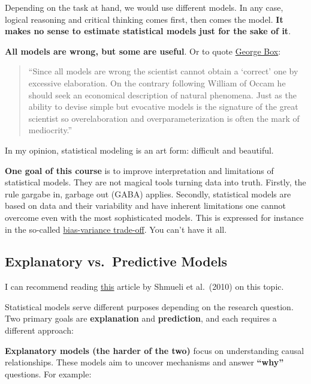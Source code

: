 \documentclass[
]{book}
\begin{document}
Depending on the task at hand, we would use different models.
In any case, logical reasoning and critical thinking comes first,
then comes the model. \textbf{It makes no sense to estimate statistical models just for the sake of it}.

\textbf{All models are wrong, but some are useful}.
Or to quote \href{https://www.tandfonline.com/doi/abs/10.1080/01621459.1976.10480949}{George Box}:

\begin{quote}
``Since all models are wrong the scientist cannot obtain
a `correct' one by excessive elaboration. On the contrary
following William of Occam he should seek an economical
description of natural phenomena. Just as the ability to
devise simple but evocative models is the signature of the
great scientist so overelaboration and overparameterization is often the mark of mediocrity.''
\end{quote}

In my opinion, statistical modeling is an art form: difficult and beautiful.

\textbf{One goal of this course} is to improve interpretation and limitations of statistical models.
They are not magical tools turning data into truth. Firstly, the rule gargabe in, garbage out (GABA) applies.
Secondly, statistical models are based on data and their variability and have inherent limitations
one cannot overcome even with the most sophisticated models. This is expressed for instance
in the so-called \href{https://en.wikipedia.org/wiki/Bias\%E2\%80\%93variance_tradeoff}{bias-variance trade-off}.
You can't have it all.

\subsection{Explanatory vs.~Predictive Models}\label{explanatory-vs.-predictive-models}

I can recommend reading \href{https://projecteuclid.org/journals/statistical-science/volume-25/issue-3/To-Explain-or-to-Predict/10.1214/10-STS330.full}{this}
article by Shmueli et al.~(2010) on this topic.

Statistical models serve different purposes depending on the research question. Two primary goals are \textbf{explanation}
and \textbf{prediction}, and each requires a different approach:

\textbf{Explanatory models (the harder of the two)} focus on understanding causal
relationships.
These models aim to uncover mechanisms and answer \textbf{``why''}
questions. For example:
\end{document}
